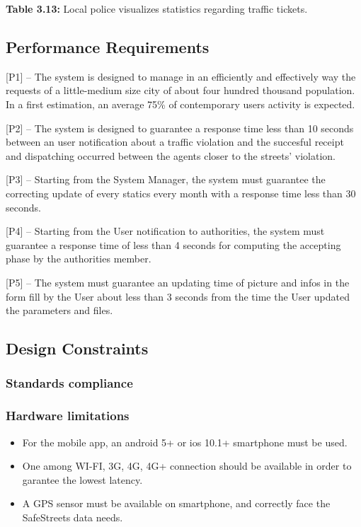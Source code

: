 \documentclass[12pt]{article}
\begin{document}
		  \textbf{Table 3.13:} Local police visualizes statistics regarding traffic tickets.
\vspace{5mm}
\subsection{ Performance Requirements}
\vspace{4mm}
\begin{flushleft}

[P1] – The system is designed to manage in an efficiently and effectively way the requests of a little-medium size city of about four hundred thousand population. In a first estimation, an average 75\% of contemporary users activity is expected.
\vspace{2mm}

[P2] – The system is designed to guarantee a response time less than 10 seconds between an user notification about a traffic violation and the succesful receipt and dispatching occurred between the agents closer to the streets’ violation.
\vspace{2mm}

[P3] – Starting from the System Manager, the system must guarantee the correcting update of every statics every month with a response time less than 30 seconds.
\vspace{2mm}

[P4] – Starting from the User notification to authorities, the system must guarantee a response time of less than 4 seconds for computing the accepting phase by the authorities member.
\newpage

\vspace{2mm}
[P5] – The system must guarantee an updating time of picture and infos in the form fill by the User about less than 3 seconds from the time the User updated the parameters and files.
\end{flushleft}


\subsection{Design Constraints}

\subsubsection{Standards compliance}

\subsubsection{Hardware limitations}
\vspace{3mm}\begin{itemize}
\item For the mobile app, an android 5+ or ios 10.1+ smartphone must be used.

\item One among WI-FI, 3G, 4G, 4G+ connection should be available in order to garantee the lowest latency.

\item A GPS sensor must be available on smartphone, and correctly face the SafeStreets data needs.

\end{itemize}
\end{document}

